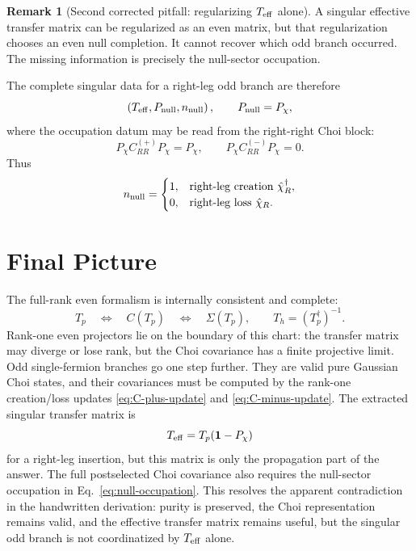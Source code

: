 \documentclass[aps,prb,onecolumn,nofootinbib,superscriptaddress]{revtex4-2}
\newcommand{\I}{\mathbf{1}}
\theoremstyle{plain}
\theoremstyle{definition}
\newtheorem{remark}{Remark}
\begin{document}
\begin{remark}[Second corrected pitfall: regularizing \(T_{\rm eff}\) alone]
A singular effective transfer matrix can be regularized as an even matrix, but
that regularization chooses an even null completion.  It cannot recover which
odd branch occurred.  The missing information is precisely the null-sector
occupation.
\end{remark}

The complete singular data for a right-leg odd branch are therefore
\begin{equation}
  \left(T_{\rm eff},P_{\rm null},n_{\rm null}\right),
  \qquad
  P_{\rm null}=P_\chi,
  \label{eq:singular-data}
\end{equation}
where the occupation datum may be read from the right-right Choi block:
\begin{equation}
  P_\chi C_{RR}^{(+)}P_\chi=P_\chi,
  \qquad
  P_\chi C_{RR}^{(-)}P_\chi=0.
  \label{eq:null-occupation}
\end{equation}
Thus
\begin{equation}
  n_{\rm null}=
  \begin{cases}
    1, & \text{right-leg creation } \hat\chi_R^\dagger,\\
    0, & \text{right-leg loss } \hat\chi_R .
  \end{cases}
  \label{eq:n-null}
\end{equation}

\section{Final Picture}

The full-rank even formalism is internally consistent and complete:
\begin{equation}
  T_p
  \quad\Longleftrightarrow\quad
  C(T_p)
  \quad\Longleftrightarrow\quad
  \Sigma(T_p),
  \qquad
  T_h=(T_p^\dagger)^{-1}.
  \label{eq:even-equivalence}
\end{equation}
Rank-one even projectors lie on the boundary of this chart: the transfer
matrix may diverge or lose rank, but the Choi covariance has a finite
projective limit.  Odd single-fermion branches go one step further.  They are
valid pure Gaussian Choi states, and their covariances must be computed by the
rank-one creation/loss updates \eqref{eq:C-plus-update} and
\eqref{eq:C-minus-update}.  The extracted singular transfer matrix is
\begin{equation}
  T_{\rm eff}=T_p(\I-P_\chi)
  \label{eq:final-Teff}
\end{equation}
for a right-leg insertion, but this matrix is only the propagation part of the
answer.  The full postselected Choi covariance also requires the null-sector
occupation in Eq.~\eqref{eq:null-occupation}.  This resolves the apparent
contradiction in the handwritten derivation: purity is preserved, the Choi
representation remains valid, and the effective transfer matrix remains useful,
but the singular odd branch is not coordinatized by \(T_{\rm eff}\) alone.
\end{document}
